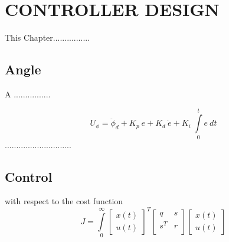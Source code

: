 
\chapter{CONTROLLER DESIGN} 
\label{chapter:ControllerDesign}
\label{controller design}

\ifpdf
    \graphicspath{{5_ControllerDesign/figures/PNG/}{5_ControllerDesign/figures/PDF/}{5_ControllerDesign/figures/}}
\else
    \graphicspath{{5_ControllerDesign/figures/EPS/}{5_ControllerDesign/figures/}}
\fi


This Chapter................
\section{Angle}
\noindent A ................

\begin{equation}
\label{fblin2}
U_{\phi} = \ddot{\phi}_d + K_p\ e + K_d\ \dot{e} + K_i\ \int\limits_{0}^{t}e\ dt
\end{equation}
.............................
\section{Control}
with respect to the cost function
\begin{equation}
\label{lqr2}
J = \int\limits_{0}^{\infty} \left[ \begin{array}{c} x(t) \\ u(t) \end{array}  \right]^T \begin{bmatrix}
q & s   \\
s^T & r \\
\end{bmatrix}\left[ \begin{array}{c} x(t) \\ u(t) \end{array}  \right]
\end{equation}



